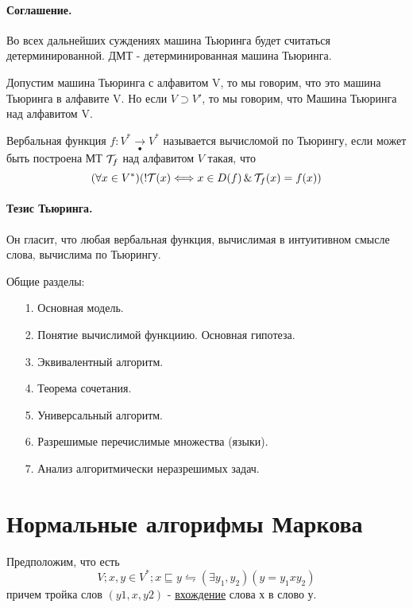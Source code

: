 \medskip

\paragraph*{Соглашение.}
Во всех дальнейших суждениях машина Тьюринга будет считаться детерминированной. ДМТ - 
детерминированная машина Тьюринга.

\medskip

Допустим машина Тьюринга с алфавитом V, то мы говорим, что это машина Тьюринга в
алфавите V. Но если $V \supset V'$, то мы говорим, что Машина Тьюринга над алфавитом
V.

\begin{definition}
    Вербальная функция $f: V^{*} \underset{\bullet}{\to} V^{*}$ называется вычисломой по Тьюрингу,
если может быть построена МТ  $ {\cal T}_{f}$ над алфавитом $V$ такая, что  \[
        (\forall x \in V^{*})
        (! {\cal T}(x) \Longleftrightarrow x \in D(f) \operatorname{\&} {\cal T}_{f}(x) = f(x))
    \] 
\end{definition}

\paragraph*{Тезис Тьюринга.}
Он гласит, что любая вербальная функция, вычислимая в интуитивном смысле слова, вычислима
по Тьюрингу.

\medskip

Общие разделы:
\begin{itemize}
    \item[1.] Основная модель.
    \item[2.] Понятие вычислимой функциию. Основная гипотеза.
    \item[3.] Эквивалентный алгоритм.
    \item[4.] Теорема сочетания.
    \item[5.] Универсальный алгоритм.
    \item[6.] Разрешимые перечислимые множества (языки).
    \item[7.] Анализ алгоритмически неразрешимых задач.
\end{itemize}

\section{Нормальные алгорифмы Маркова}

Предположим, что есть
\[
    V; x,y \in V^{*}; x\sqsubseteq y \leftrightharpoons (\exists y_1,y_2)(y=y_1xy_2)
\] 
причем тройка слов $(y1,x,y2)$ - \underline{вхождение} слова х в слово у.

